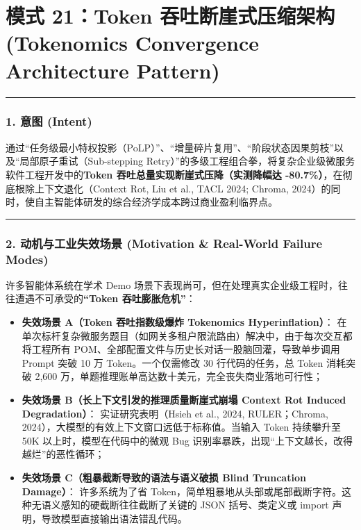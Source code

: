 \section{模式 21：Token 吞吐断崖式压缩架构 (Tokenomics Convergence
Architecture
Pattern)}\label{ux6a21ux5f0f-21token-ux541eux5410ux65adux5d16ux5f0fux538bux7f29ux67b6ux6784-tokenomics-convergence-architecture-pattern}

\begin{center}\rule{0.5\linewidth}{0.5pt}\end{center}

\subsubsection{1. 意图 (Intent)}\label{ux610fux56fe-intent-20}

通过``任务级最小特权投影（PoLP）''、``增量碎片复用''、``阶段状态因果剪枝''以及``局部原子重试（Sub-stepping
Retry）''的多级工程组合拳，将复杂企业级微服务软件工程开发中的\textbf{Token
吞吐总量实现断崖式压降（实测降幅达
-80.7\%）}，在彻底根除上下文退化（Context Rot, Liu et al., TACL 2024;
Chroma,
2024）的同时，使自主智能体研发的综合经济学成本跨过商业盈利临界点。

\begin{center}\rule{0.5\linewidth}{0.5pt}\end{center}

\subsubsection{2. 动机与工业失效场景 (Motivation \& Real-World Failure
Modes)}\label{ux52a8ux673aux4e0eux5de5ux4e1aux5931ux6548ux573aux666f-motivation-real-world-failure-modes-20}

许多智能体系统在学术 Demo
场景下表现尚可，但在处理真实企业级工程时，往往遭遇不可承受的\textbf{``Token
吞吐膨胀危机''}：

\begin{itemize}
\tightlist
\item
  \textbf{失效场景 A（Token 吞吐指数级爆炸 Tokenomics
  Hyperinflation）}：
  在单次标杆复杂微服务题目（如网关多租户限流路由）解决中，由于每次交互都将工程所有
  POM、全部配置文件与历史长对话一股脑回灌，导致单步调用 Prompt 突破 10
  万 Token。一个仅需修改 30 行代码的任务，总 Token 消耗突破 2,600
  万，单题推理账单高达数十美元，完全丧失商业落地可行性；
\item
  \textbf{失效场景 B（长上下文引发的推理质量断崖式崩塌 Context Rot
  Induced Degradation）}： 实证研究表明（Hsieh et al., 2024,
  RULER；Chroma, 2024），大模型的有效上下文窗口远低于标称值。当输入
  Token 持续攀升至 50K 以上时，模型在代码中的微观 Bug
  识别率暴跌，出现``上下文越长，改得越烂''的恶性循环；
\item
  \textbf{失效场景 C（粗暴截断导致的语法与语义破损 Blind Truncation
  Damage）}： 许多系统为了省
  Token，简单粗暴地从头部或尾部截断字符。这种无语义感知的硬截断往往截断了关键的
  JSON 括号、类定义或 import 声明，导致模型直接输出语法错乱代码。
\end{itemize}

